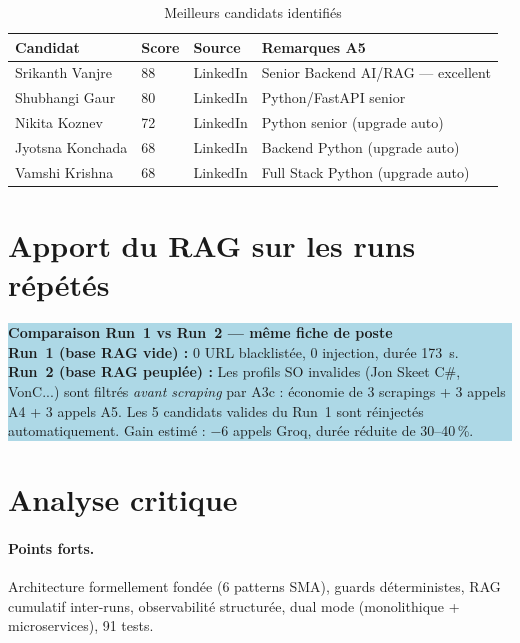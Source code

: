 \documentclass[12pt,a4paper]{report}
\begin{document}
\begin{table}[H]
\centering
\caption{Meilleurs candidats identifiés}
\label{tab:candidats}
\begin{tabularx}{\textwidth}{L{4cm}C{1.5cm}C{2cm}L{5.5cm}}
\toprule
\textbf{Candidat} & \textbf{Score} & \textbf{Source} & \textbf{Remarques A5} \\
\midrule
Srikanth Vanjre & 88 & LinkedIn & Senior Backend AI/RAG --- excellent \\
Shubhangi Gaur & 80 & LinkedIn & Python/FastAPI senior \\
Nikita Koznev & 72 & LinkedIn & Python senior (upgrade auto) \\
Jyotsna Konchada & 68 & LinkedIn & Backend Python (upgrade auto) \\
Vamshi Krishna & 68 & LinkedIn & Full Stack Python (upgrade auto) \\
\bottomrule
\end{tabularx}
\end{table}

\section{Apport du RAG sur les runs répétés}

\medskip
\colorbox{lightblue}{\parbox{0.95\textwidth}{\smallskip
\textbf{\color{primary}Comparaison Run~1 vs Run~2 --- même fiche de poste}\\[4pt]
\textbf{Run~1 (base RAG vide) :} 0 URL blacklistée, 0 injection, durée 173~s.\\[3pt]
\textbf{Run~2 (base RAG peuplée) :}
Les profils SO invalides (Jon Skeet C\#, VonC...) sont filtrés \textit{avant
scraping} par A3c : économie de 3 scrapings + 3 appels A4 + 3 appels A5.
Les 5 candidats valides du Run~1 sont réinjectés automatiquement.
Gain estimé : $-$6 appels Groq, durée réduite de 30--40\,\%.
\smallskip}}
\medskip

\section{Analyse critique}

\paragraph{Points forts.}
Architecture formellement fondée (6 patterns SMA), guards déterministes, RAG cumulatif
inter-runs, observabilité structurée, dual mode (monolithique + microservices), 91 tests.
\end{document}
